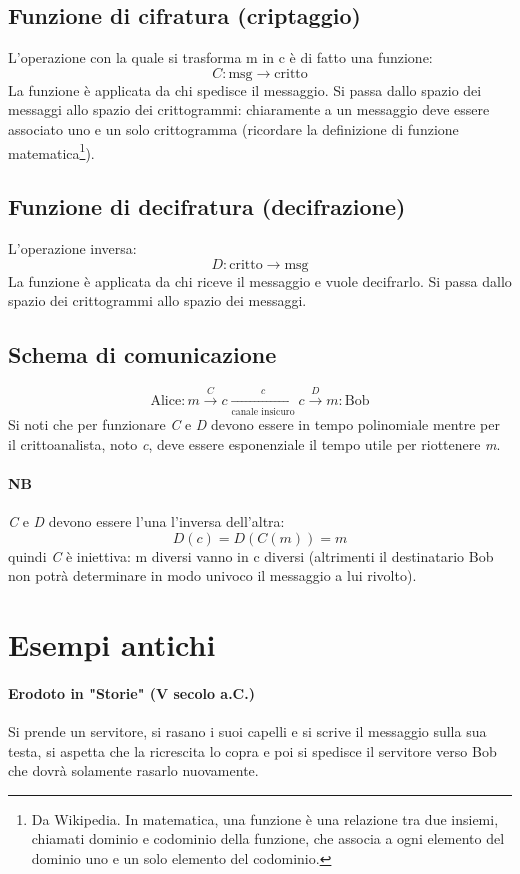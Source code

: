 \subsection{Funzione di cifratura (criptaggio)}
L'operazione con la quale si trasforma m in c è di fatto una funzione:
$$
    C: \text{msg} \longrightarrow \text{critto}
$$
La funzione è applicata da chi spedisce il messaggio. Si passa dallo spazio dei messaggi allo spazio dei crittogrammi: chiaramente a un messaggio deve essere associato uno e un solo crittogramma (ricordare la definizione di funzione matematica\footnote{Da Wikipedia. In matematica, una funzione è una relazione tra due insiemi, chiamati dominio e codominio della funzione, che associa a ogni elemento del dominio uno e un solo elemento del codominio.}).
\subsection{Funzione di decifratura (decifrazione)}
L'operazione inversa:
$$
    D: \text{critto} \longrightarrow \text{msg}
$$
La funzione è applicata da chi riceve il messaggio e vuole decifrarlo. Si passa dallo spazio dei crittogrammi allo spazio dei messaggi. 
\subsection{Schema di comunicazione}
$$
    \text{Alice}: m \xrightarrow{C} c \xrightarrow[\text{canale insicuro}]{c} c \xrightarrow{D} m : \text{Bob}
$$
Si noti che per funzionare \emph{C} e \emph{D} devono essere in tempo polinomiale mentre per il crittoanalista, noto \emph{c}, deve essere esponenziale il tempo utile per riottenere \emph{m}.
\paragraph{NB} \emph{C} e \emph{D} devono essere l'una l'inversa dell'altra:
$$
    D(c) = D(C(m)) = m
$$
quindi \emph{C} è iniettiva: m diversi vanno in c diversi (altrimenti il destinatario Bob non potrà determinare in modo univoco il messaggio a lui rivolto).

\section{Esempi antichi}
\paragraph{Erodoto in "Storie" (V secolo a.C.)} Si prende un servitore, si rasano i suoi capelli e si scrive il messaggio sulla sua testa, si aspetta che la ricrescita lo copra e poi si spedisce il servitore verso Bob che dovrà solamente rasarlo nuovamente.

